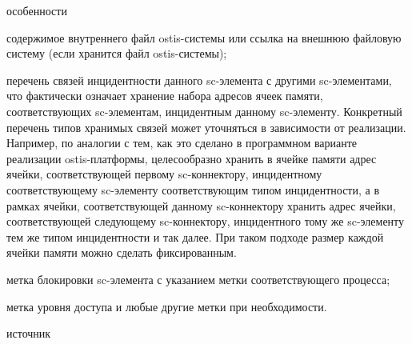 \begin{scnsubstruct}
\begin{scnrelfromset}{особенности}
{\begin{scnitemize}
				\item содержимое внутреннего файл ostis-системы или ссылка на внешнюю файловую систему (если хранится файл ostis-системы);
				\item перечень связей инцидентности данного sc-элемента с другими sc-элементами, что фактически означает хранение набора адресов ячеек памяти, соответствующих sc-элементам, инцидентным данному sc-элементу. Конкретный перечень типов хранимых связей может уточняться в зависимости от реализации. Например, по аналогии с тем, как это сделано в программном варианте реализации ostis-платформы, целесообразно хранить в ячейке памяти адрес ячейки, соответствующей первому sc-коннектору, инцидентному соответствующему sc-элементу соответствующим типом инцидентности, а в рамках ячейки, соответствующей данному sc-коннектору хранить адрес ячейки, соответствующей следующему sc-коннектору, инцидентного тому же sc-элементу тем же типом инцидентности и так далее. При таком подходе размер каждой ячейки памяти можно сделать фиксированным.
				\item метка блокировки sc-элемента с указанием метки соответствующего процесса;
				\item метка уровня доступа и любые другие метки при необходимости.
		\end{scnitemize}}
        \begin{scnindent}
            \begin{scnrelfromlist}{источник}
            \end{scnrelfromlist}
        \end{scnindent}

\end{scnrelfromset}
\end{scnsubstruct}
